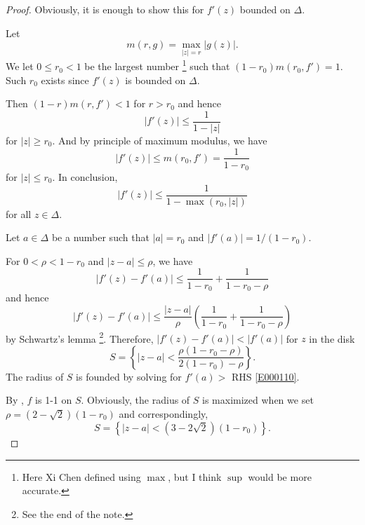 \documentclass[11pt]{amsart}
\theoremstyle{remark}
\theoremstyle{definition}
\numberwithin{equation}{section}
\begin{document}
\begin{proof}
    Obviously, it is enough to show this for $f'(z)$ bounded on $\Delta$.

    Let
    \begin{equation}\label{E000103}
        m(r, g) = \max_{|z| = r} |g(z)|.
    \end{equation}
    We let $0\le r_0 < 1$ be the largest number \footnote[1]{Here Xi Chen defined using $\max$, but I think $\sup$ would be more accurate.} such that $(1-r_0) m(r_0, f') = 1$.
    Such $r_0$ exists since $f'(z)$ is bounded on $\Delta$.

    Then
    $(1-r) m(r, f') < 1$ for $r > r_0$ and hence
    \begin{equation}\label{E000104}
        |f'(z)| \le \frac{1}{1 - |z|}
    \end{equation}
    for $|z| \ge r_0$. And by principle of maximum modulus, we have
    \begin{equation}\label{E000105}
        |f'(z)| \le m(r_0, f') = \frac{1}{1 - r_0}
    \end{equation}
    for $|z| \le r_0$. In conclusion,
    \begin{equation}\label{E000106}
        |f'(z)| \le \frac{1}{1 - \max(r_0, |z|)}
    \end{equation}
    for all $z\in \Delta$.

    Let $a\in \Delta$ be a number such that $|a| = r_0$ and $|f'(a)| = 1/(1-r_0)$.

    For $0 < \rho < 1-r_0$ and $|z - a| \le \rho$, we have
    \begin{equation}\label{E000107}
        |f'(z) - f'(a)| \le \frac{1}{1 - r_0} + \frac{1}{1 - r_0 - \rho}
    \end{equation}
    and hence
    \begin{equation}\label{E000108}
        |f'(z) - f'(a)| \le \frac{|z - a|}{\rho}
        \left(\frac{1}{1 - r_0} + \frac{1}{1 - r_0 - \rho}\right)
    \end{equation}
    by Schwartz's lemma \footnote[2]{See the end of the note.}. Therefore,
    $|f'(z) - f'(a)| < |f'(a)|$ for $z$ in the disk
    \begin{equation}\label{E000110}
        S = \left\{|z - a| < \frac{\rho(1-r_0-\rho)}{2(1-r_0) - \rho}\right\}.
    \end{equation}
    The radius of $S$ is founded by solving for $f'(a)>$ RHS \ref{E000110}.

    By , $f$ is 1-1 on $S$. Obviously, the radius of $S$ is maximized when we set
    $\rho = (2-\sqrt{2})(1-r_0)$ and correspondingly,
    \begin{equation}\label{E000111}
        S = \left\{|z-a| < (3-2\sqrt{2})(1 - r_0)\right\}.
    \end{equation}


\end{proof}
\end{document}
